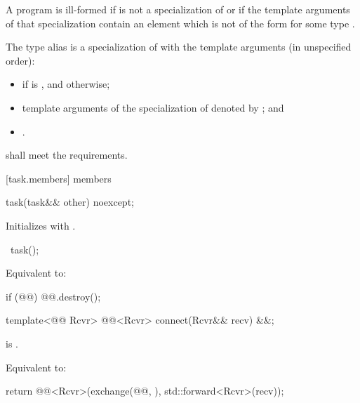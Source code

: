 \pnum
 A program is ill-formed if  is not a
specialization of 
or if the template arguments of that specialization
contain an element which is not of the form
 for some type .

\pnum
The type alias  is a specialization
of  with the template
arguments (in unspecified order):
\begin{itemize}
\item {} if  is ,
and  otherwise;
\item template arguments of the specialization of
 denoted by ;
and
\item {}.
\end{itemize}

\pnum
{} shall meet the 
requirements.

[task.members]{ members}

%
\begin{itemdecl}
task(task&& other) noexcept;
\end{itemdecl}
\begin{itemdescr}
\pnum
\effects
Initializes  with .
\end{itemdescr}

%
\begin{itemdecl}
~task();
\end{itemdecl}
\begin{itemdescr}
\pnum
\effects
Equivalent to:
\begin{codeblock}
if (@@)
  @@.destroy();
\end{codeblock}
\end{itemdescr}

%
\begin{itemdecl}
template<@@ Rcvr>
  @@<Rcvr> connect(Rcvr&& recv) &&;
\end{itemdecl}
\begin{itemdescr}
\pnum
\expects
{} is .

\pnum
\effects
Equivalent to:
\begin{codeblock}
return @@<Rcvr>(exchange(@@, {}), std::forward<Rcvr>(recv));
\end{codeblock}
\end{itemdescr}

